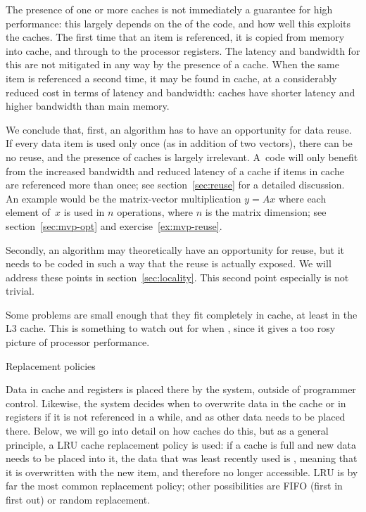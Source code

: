 The presence of one or more caches is not immediately a guarantee for
high performance: this largely depends on the  of the code, and how well this exploits the caches.
The first time that an item is
referenced, it is copied from memory into cache, and through to the
processor registers. The latency and bandwidth for this are not mitigated in any
way by the presence of a cache. When the same item is referenced a
second time, it may be found in cache, at a considerably reduced cost
in terms of latency and bandwidth: caches have shorter latency and
higher bandwidth than main memory.

We conclude that, first, an algorithm has to have an opportunity for
data reuse. If every data item is used only once (as in addition of
two vectors), there can be no reuse, and the presence of caches is
largely irrelevant. A~code will only benefit from the increased
bandwidth and reduced latency of a cache if items in cache are
referenced more than once; see section~\ref{sec:reuse} for a detailed
discussion.
An example would be the matrix-vector multiplication
$y=Ax$ where each element of~$x$ is used in $n$ operations, where $n$
is the matrix dimension;
see section~\ref{sec:mvp-opt}
and exercise~\ref{ex:mvp-reuse}.

Secondly, an algorithm may theoretically
have an opportunity for reuse, but it needs to be coded in such a way
that the reuse is actually exposed. We will address these points in
section~\ref{sec:locality}. This second point especially is not
trivial.

Some problems are small enough that they fit completely in cache, at
least in the L3 cache. This is something to watch out for when
, since it gives a too rosy picture of
processor performance.

 {Replacement policies}
\label{sec:lru}

Data in cache and registers is placed there by the system, outside of
programmer control. Likewise, the system decides when to overwrite
data in the cache or in registers if it is not referenced in a while,
and as other data needs to be placed there.  Below, we will go into
detail on how caches do this, but as a general principle, a \acf{LRU}
cache replacement policy is used: if a cache is full and new data
needs to be placed into it, the data that was least recently used is
,
meaning that it is overwritten with the new item,
and therefore no longer accessible. LRU is by far the most common
replacement policy; other possibilities are FIFO (first in first out)
or random replacement.

